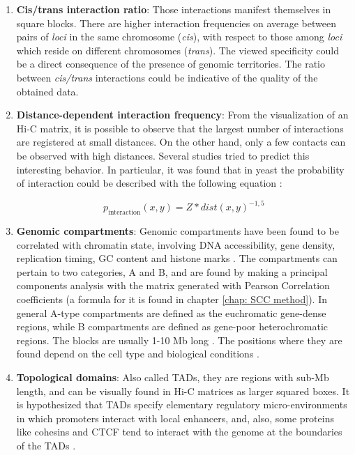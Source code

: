 \begin{enumerate}
    \item \textbf{Cis/trans interaction ratio}: Those interactions manifest themselves in square blocks. There are higher interaction frequencies on average between pairs of \textit{loci} in the same chromosome (\textit{cis}), with respect to those among \textit{loci} which reside on different chromosomes (\textit{trans}). The viewed specificity could be a direct consequence of the presence of genomic territories. The ratio between \textit{cis/trans} interactions could be indicative of the quality of the obtained data.
    
    \item \textbf{Distance-dependent interaction frequency}: From the visualization of an Hi-C matrix, it is possible to observe that the largest number of interactions are registered at small distances. On the other hand, only a few contacts can be observed with high distances. Several studies tried to predict this interesting behavior. In particular, it was found that in yeast the probability of interaction could be described with the following equation
    \cite{lajoieHitchhikerGuideHiC2015}:
    
    $$
        p_{\text{interaction}}(x,y) = Z * dist(x,y)^{-1,5}
    $$
    
    \item \textbf{Genomic compartments}: Genomic compartments have been found to be correlated with chromatin state, involving DNA accessibility, gene density, replication timing, GC content and histone marks
    \cite{lieberman-aidenComprehensiveMappingLong2009}. 
    The compartments can pertain to two categories, A and B, and are found by making a principal components analysis with the matrix generated with Pearson Correlation coefficients (a formula for it is found in chapter \ref{chap: SCC method}). In general A-type compartments are defined as the euchromatic gene-dense regions, while B compartments are defined as gene-poor heterochromatic regions. The blocks are usually 1-10 Mb long
    \cite{lajoieHitchhikerGuideHiC2015}.
    The positions where they are found depend on the cell type and biological conditions
    \cite{lajoieHitchhikerGuideHiC2015}.
    
    \item \textbf{Topological domains}: Also called TADs, they are regions with sub-Mb length, and can be visually found in Hi-C matrices as larger squared boxes. It is hypothesized that TADs specify elementary regulatory micro-environments in which promoters interact with local enhancers, and, also, some proteins like cohesins and CTCF tend to interact with the genome at the boundaries of the TADs
    \cite{lajoieHitchhikerGuideHiC2015}.
    

\end{enumerate}
